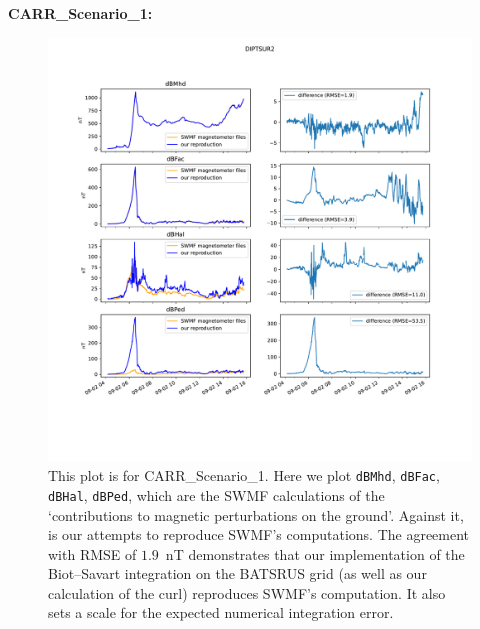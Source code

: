 \documentclass{article}
\begin{document}
\textbf{CARR\_Scenario\_1:}

\begin{figure}[H]
  \includegraphics[width=\textwidth]{figures/DIPTSUR2-reproduceswmf.pdf}
  \caption{
  This plot is for CARR\_Scenario\_1.
  Here we plot \texttt{dBMhd}, \texttt{dBFac}, \texttt{dBHal}, \texttt{dBPed},
  which are the SWMF calculations of the `contributions to magnetic perturbations on the ground'. Against it, is our attempts to reproduce SWMF's computations.
  The agreement with RMSE of $1.9$~nT demonstrates that our implementation of the Biot--Savart integration on the BATSRUS grid (as well as our calculation of the curl) reproduces SWMF's computation.
  It also sets a scale for the expected numerical integration error.
  }
  \label{CARRreproduceswmf}
\end{figure}
\end{document}
